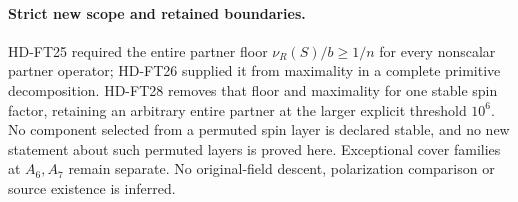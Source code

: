 \paragraph{Strict new scope and retained boundaries.}
HD-FT25 required the entire partner floor
$\nu_R(S)/b\ge1/n$ for every nonscalar partner operator;
HD-FT26 supplied it from maximality in a complete primitive
decomposition.  HD-FT28 removes that floor and maximality for
one stable spin factor, retaining an arbitrary entire partner
at the larger explicit threshold $10^6$.  No component selected
from a permuted spin layer is declared stable, and no new
statement about such permuted layers is proved here.  Exceptional
cover families at $A_6,A_7$ remain separate.  No original-field
descent, polarization comparison or source existence is inferred.
